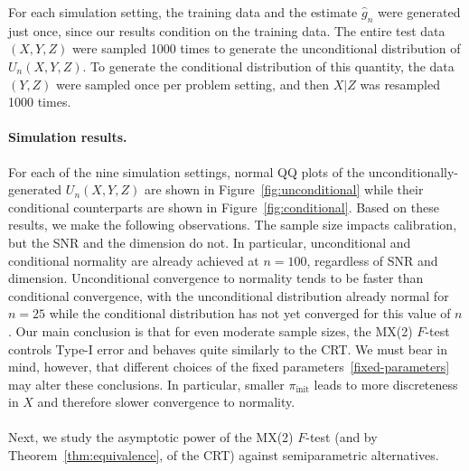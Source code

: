 \documentclass[12pt]{article}
\theoremstyle{definition}
\theoremstyle{remark}
\newcommand{\srx}{X}
\newcommand{\srz}{Z}
\newcommand{\sry}{Y}
\begin{document}
For each simulation setting, the training data and the estimate $\widehat g_n$ were generated just once, since our results condition on the training data. The entire test data $(\srx, \sry, \srz)$  were sampled 1000 times to generate the unconditional distribution of $U_n(\srx, \sry, \srz)$. To generate the conditional distribution of this quantity, the data $(\sry, \srz)$ were sampled once per problem setting, and then $\srx|\srz$ was resampled 1000 times. 

\paragraph{Simulation results.}

For each of the nine simulation settings, normal QQ plots of the unconditionally-generated $U_n(\srx, \sry, \srz)$ are shown in Figure~\ref{fig:unconditional} while their conditional counterparts are shown in Figure~\ref{fig:conditional}. Based on these results, we make the following observations. The sample size impacts calibration, but the SNR and the dimension do not. In particular, unconditional and conditional normality are already achieved at $n = 100$, regardless of SNR and dimension. Unconditional convergence to normality tends to be faster than conditional convergence, with the unconditional distribution already normal for $n = 25$ while the conditional distribution has not yet converged for this value of $n$. Our main conclusion is that for even moderate sample sizes, the MX(2) $F$-test controls Type-I error and behaves quite similarly to the CRT. We must bear in mind, however, that different choices of the fixed parameters~\eqref{fixed-parameters} may alter these conclusions. In particular, smaller $\pi_{\text{init}}$ leads to more discreteness in $\srx$ and therefore slower convergence to normality.

\paragraph{}
Next, we study the asymptotic power of the MX(2) $F$-test (and by Theorem~\ref{thm:equivalence}, of the CRT) against semiparametric alternatives. 

\clearpage
\end{document}
